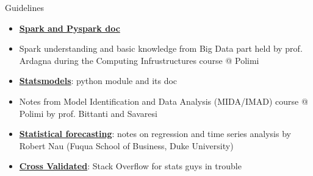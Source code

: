 \documentclass[british]{beamer}
\begin{document}
\begin{frame}{Guidelines}
	\begin{itemize}
		\item \href{https://spark.apache.org/docs/2.1.0/api/python/}{\textbf{Spark and Pyspark doc}}
		\item Spark understanding and basic knowledge from Big Data part held by prof. Ardagna during the Computing Infrustructures course @ Polimi
		\item \href{http://www.statsmodels.org/stable/index.html}{\textbf{Statsmodels}}: python module and its doc 
		\item Notes from Model Identification and Data Analysis (MIDA/IMAD) course @ Polimi by prof. Bittanti and Savaresi
		\item \href{http://people.duke.edu/~rnau/411home.htm}{\textbf{Statistical forecasting}}: notes on regression and time series analysis by Robert Nau (Fuqua School of Business, Duke University) 
		\item \href{https://stats.stackexchange.com/}{\textbf{Cross Validated}}: Stack Overflow for stats guys in trouble
	\end{itemize}
\end{frame}
\end{document}
